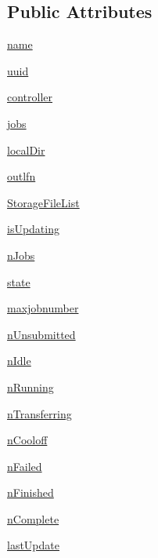 \subsection*{Public Attributes}
\begin{DoxyCompactItemize}
\item 
\hyperlink{classcrabFunctions_1_1CrabTask_aa80858da99b1fcffc8c57b90c8c8764d}{name}
\item 
\hyperlink{classcrabFunctions_1_1CrabTask_affbe775c3b27516558abe99c944a0b99}{uuid}
\item 
\hyperlink{classcrabFunctions_1_1CrabTask_a653cc1b50b00d31ecae424bb7f301800}{controller}
\item 
\hyperlink{classcrabFunctions_1_1CrabTask_a746a99ff156515200f1d0d82aa223262}{jobs}
\item 
\hyperlink{classcrabFunctions_1_1CrabTask_a09e81135abf744a23819f3919a573206}{local\-Dir}
\item 
\hyperlink{classcrabFunctions_1_1CrabTask_a38bd8487c57f35cdd6ae501f5b33c017}{outlfn}
\item 
\hyperlink{classcrabFunctions_1_1CrabTask_a015df9b7234b765d870a734689470f4d}{Storage\-File\-List}
\item 
\hyperlink{classcrabFunctions_1_1CrabTask_a67ffd96ff5dea4a166810258109f85cc}{is\-Updating}
\item 
\hyperlink{classcrabFunctions_1_1CrabTask_a4624f348accb397ec35cd39b4c0a92c3}{n\-Jobs}
\item 
\hyperlink{classcrabFunctions_1_1CrabTask_abf88207404f21e51baeb63cd2696a441}{state}
\item 
\hyperlink{classcrabFunctions_1_1CrabTask_a3bd1d90e824ffd4e94c2670fc788d8f3}{maxjobnumber}
\item 
\hyperlink{classcrabFunctions_1_1CrabTask_ac74ab3617a3e548308553dacc6fb716f}{n\-Unsubmitted}
\item 
\hyperlink{classcrabFunctions_1_1CrabTask_ac9500df5154af29230bf46b70c8b972e}{n\-Idle}
\item 
\hyperlink{classcrabFunctions_1_1CrabTask_ac9d85013f7112716fcba03f32537ba28}{n\-Running}
\item 
\hyperlink{classcrabFunctions_1_1CrabTask_a5bf3783f609d571ad0f1d5c620ed599e}{n\-Transferring}
\item 
\hyperlink{classcrabFunctions_1_1CrabTask_a91df6d635863bd407e0d368bc02c673f}{n\-Cooloff}
\item 
\hyperlink{classcrabFunctions_1_1CrabTask_ac3f25df360da05d896e74a8581b68f1e}{n\-Failed}
\item 
\hyperlink{classcrabFunctions_1_1CrabTask_a07d947089d0cebe911f7b7d6b6f985de}{n\-Finished}
\item 
\hyperlink{classcrabFunctions_1_1CrabTask_a4bc6a096cbaf7d7856f849fbbafce01c}{n\-Complete}
\item 
\hyperlink{classcrabFunctions_1_1CrabTask_ad4158ae02f09d137a6f2725316f97d29}{last\-Update}
\end{DoxyCompactItemize}


